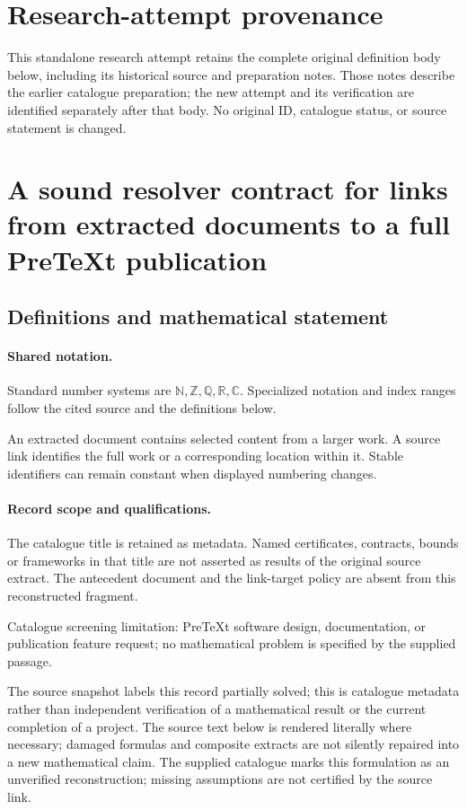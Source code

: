 \documentclass[11pt]{article}
\begin{document}
\section*{Research-attempt provenance}
This standalone research attempt retains the complete original definition body below,
including its historical source and preparation notes. Those notes describe the
earlier catalogue preparation; the new attempt and its verification are identified
separately after that body. No original ID, catalogue status, or source statement is changed.

\section{A sound resolver contract for links from extracted documents to a full PreTeXt publication}\label{statement}

\subsection{Definitions and mathematical statement}

\paragraph{Shared notation.}Standard number systems are $\mathbb N,\mathbb Z,\mathbb Q,\mathbb R,\mathbb C$. Specialized notation and index ranges follow the cited source and the definitions below.


An extracted document contains selected content from a larger work. A source link identifies the full work or a corresponding location within it. Stable identifiers can remain constant when displayed numbering changes.
\paragraph{Record scope and qualifications.}
The catalogue title is retained as metadata. Named certificates, contracts, bounds or frameworks in that title are not asserted as results of the original source extract.
The antecedent document and the link-target policy are absent from this reconstructed fragment.

Catalogue screening limitation: PreTeXt software design, documentation, or publication feature request; no mathematical problem is specified by the supplied passage.

The source snapshot labels this record partially solved; this is catalogue metadata rather than independent verification of a mathematical result or the current completion of a project.
The source text below is rendered literally where necessary; damaged formulas and composite extracts are not silently repaired into a new mathematical claim.
The supplied catalogue marks this formulation as an unverified reconstruction; missing assumptions are not certified by the source link.
\end{document}
